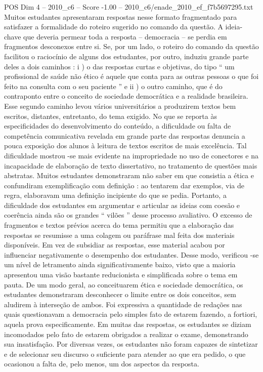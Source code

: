 \begin{textsample}{POS Dim 4 – 2010\_c6 – Score -1.00 – 2010\_c6/enade\_2010\_ef\_f7b5697295.txt}
Muitos estudantes apresentaram respostas nesse formato fragmentado para satisfazer a formalidade do roteiro sugerido no comando da questão.
A ideia-chave que deveria permear toda a resposta – democracia – se perdia em fragmentos desconexos entre si.
Se, por um lado, o roteiro do comando da questão facilitou o raciocínio de alguns dos estudantes, por outro, induziu grande parte deles a dois caminhos : i ) o das respostas curtas e objetivas, do tipo “ um profissional de saúde não ético é aquele que conta para as outras pessoas o que foi feito na consulta com o seu paciente ” e ii ) o outro caminho, que é do contraponto entre o conceito de sociedade democrática e a realidade brasileira.
Esse segundo caminho levou vários universitários a produzirem textos bem escritos, distantes, entretanto, do tema exigido.
No que se reporta às especificidades do desenvolvimento do conteúdo, a dificuldade ou falta de competência comunicativa revelada em grande parte das respostas denuncia a pouca exposição dos alunos à leitura de textos escritos de mais excelência.
Tal dificuldade mostrou -se mais evidente na impropriedade no uso de conectores e na incapacidade de elaboração de texto dissertativo, no tratamento de questões mais abstratas.
Muitos estudantes demonstraram não saber em que consistia a ética e confundiram exemplificação com definição : ao tentarem dar exemplos, via de regra, elaboravam uma definição incipiente do que se pedia.
Portanto, a dificuldade dos estudantes em argumentar e articular as ideias com coesão e coerência ainda são os grandes “ vilões ” desse processo avaliativo.
O excesso de fragmentos e textos prévios acerca do tema permitiu que a elaboração das respostas se resumisse a uma colagem ou paráfrase mal feita dos materiais disponíveis.
Em vez de subsidiar as respostas, esse material acabou por influenciar negativamente o desempenho dos estudantes.
Desse modo, verificou -se um nível de letramento ainda significativamente baixo, visto que a maioria apresentou uma visão bastante reducionista e simplificada sobre o tema em pauta.
De um modo geral, ao conceituarem ética e sociedade democrática, os estudantes demonstraram desconhecer o limite entre os dois conceitos, sem aludirem à interseção de ambos.
Foi expressiva a quantidade de redações nas quais questionavam a democracia pelo simples fato de estarem fazendo, a fortiori, aquela prova especificamente.
Em muitas das respostas, os estudantes se diziam incomodados pelo fato de estarem obrigados a realizar o exame, demonstrando sua insatisfação.
Por diversas vezes, os estudantes não foram capazes de sintetizar e de selecionar seu discurso o suficiente para atender ao que era pedido, o que ocasionou a falta de, pelo menos, um dos aspectos da resposta.

\end{textsample}
